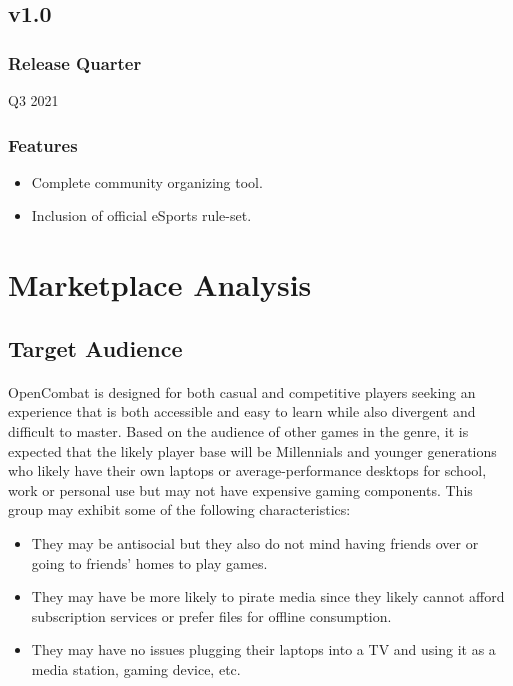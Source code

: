 \subsection{v1.0}

\subsubsection{Release Quarter}

Q3 2021

\subsubsection{Features}

\begin{itemize}
    \item Complete community organizing tool.
    \item Inclusion of official eSports rule-set.
\end{itemize}

\section{Marketplace Analysis}

\subsection{Target Audience}

\paragraph{} OpenCombat is designed for both casual and competitive players seeking an experience that is both accessible and easy to learn while also divergent and difficult to master. Based on the audience of other games in the genre, it is expected that the likely player base will be Millennials and younger generations who likely have their own laptops or average-performance desktops for school, work or personal use but may not have expensive gaming components. This group may exhibit some of the following characteristics:

\begin{itemize}
    \item They may be antisocial but they also do not mind having friends over or going to friends' homes to play games.
    \item They may have be more likely to pirate media since they likely cannot afford subscription services or prefer files for offline consumption.
    \item They may have no issues plugging their laptops into a TV and using it as a media station, gaming device, etc.
\end{itemize}

